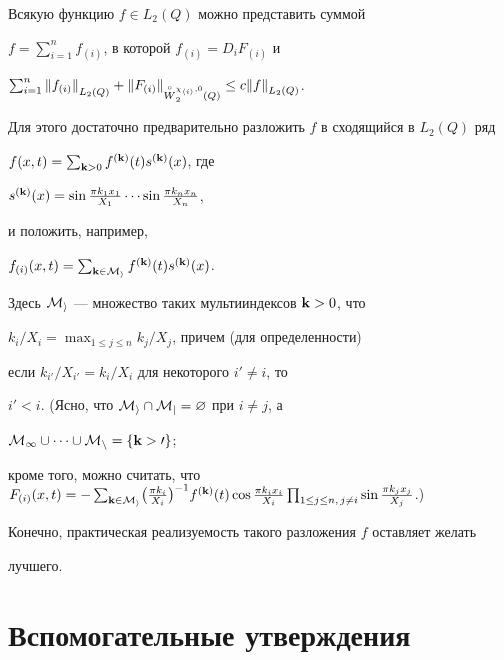 \begin{note} Всякую функцию $f\in L_2(Q)$ можно представить суммой


$f=\sum_{i=1}^nf_{(i)}$, в которой $f_{(i)}=D_iF_{(i)}$ и 


$\sum_{i=1}^n{\ver f_{(i)}\ver}_{L_2(Q)}+{\ver F_{(i)}\ver


}_{\overset{\circ}{W}{}_2^{{\chi_{\langle i\rangle}},0}(Q)}\le c{\ver f\ver


}_{L_2(Q)}$.


Для этого достаточно предварительно разложить $f$ в сходящийся в $L_2(Q)$ ряд


$f(x,t)=\sum_{{\bold k}>0}f^{({\bold k})}(t)s^{(\bold k)}(x)$, где 


$s^{(\bold k)}(x)=\sin\tfrac{\pi k_1x_1}{X_1}\dotsb\sin\tfrac{\pi k_nx_n}{X_n}$,


и положить, например,


$f_{(i)}(x,t)=\sum_{{\bold k}\in \cal M_i}f^{(\bold k)}


(t)s^{(\bold k)}(x)$.


Здесь $\cal M_i$ --- множество таких мультииндексов ${\bold k}>0$, что 


$k_i/X_i={\max}_{1\le j\le n}k_j/X_j$, причем (для определенности)


если $k_{i'}/X_{i'}=k_i/X_i$ для некоторого $i'\ne i$, то


$i'<i$. (Ясно, что $\cal M_i\cap \cal M_j=\varnothing$ при $i\ne j$, а 


$\cal M_1\cup\dotsb\cup\cal M_n=\{{\bold k}>0\}$;


кроме того, можно считать, что $F_{(i)}(x,t)=-\sum_{\bold k\in\cal M_i}


\bigl(\tfrac{\pi k_i}{X_i}\bigr)^{-1}f^{(\bold k)}(t)\cos\tfrac{\pi k_ix_i}{X_i}


\prod_{1\le j\le n,\, j\ne i}\sin\tfrac{\pi k_jx_j}{X_j}$.)


Конечно, практическая реализуемость такого разложения $f$ оставляет желать


лучшего.


\end{note}





\section{Вспомогательные утверждения}





